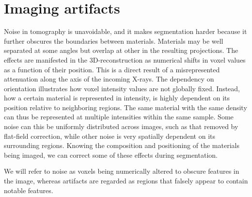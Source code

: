 \section{Imaging artifacts}
\label{sec:imaging}

Noise in tomography is unavoidable, and it makes segmentation harder because it
further obscures the boundaries between materials.  Materials may be well
separated at some angles but overlap at other in the resulting projections.
The effects are manifested in the 3D-reconstruction as numerical shifts in
voxel values as a function of their position. This is a direct result of a
misrepresented attenuation along the axis of the incoming X-rays.  The
dependency on orientation illustrates how voxel intensity values are not
globally fixed. Instead, how a certain material is represented in intensity, is
highly dependent on its position relative to neighboring regions. The same
material with the same density can thus be represented at multiple intensities
within the same sample.  Some noise can this be uniformly distributed across
images, such as that removed by flat-field correction, while other noise is
very spatially dependent on its surrounding regions.  Knowing the composition
and positioning of the materials being imaged, we can correct some of these
effects during segmentation.

We will refer to noise as voxels being numerically altered to obscure features
in the image, whereas artifacts are regarded as regions that falsely appear to
contain notable features.

